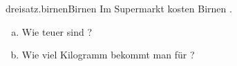 \begin{exercise}{dreisatz.birnen}{Birnen}
  \ifproblem\problem
    Im Supermarkt kosten  Birnen .
    \begin{enumerate}[a)]
      \item Wie teuer sind ?
      \item Wie viel Kilogramm bekommt man für ?
    \end{enumerate}
  \fi
\end{exercise}

